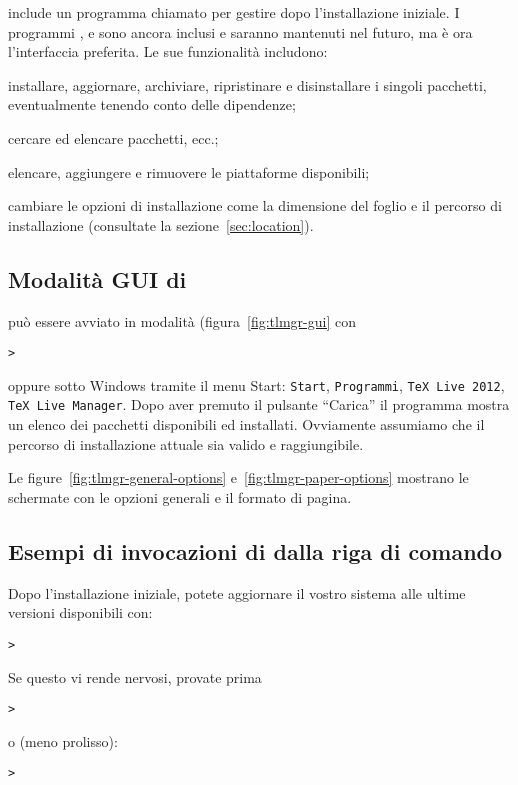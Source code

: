 \documentclass{article}
\begin{document}
\TL{} include un programma chiamato  per gestire \TL{} dopo
l'installazione iniziale. I programmi ,  e
 sono ancora inclusi e saranno mantenuti nel futuro, ma
 è ora l'interfaccia preferita. Le sue funzionalità includono:

\begin{itemize*}
\item installare, aggiornare, archiviare, ripristinare e disinstallare i
  singoli pacchetti, eventualmente tenendo conto delle dipendenze;
\item cercare ed elencare pacchetti, ecc.;
\item elencare, aggiungere e rimuovere le piattaforme disponibili;
\item cambiare le opzioni di installazione come la dimensione del foglio e
  il percorso di installazione (consultate la sezione~\ref{sec:location}).
\end{itemize*}

\subsection{Modalità GUI di }
 può essere avviato in modalità \GUI{}
(figura~\ref{fig:tlmgr-gui} con
\begin{alltt}
> 
\end{alltt}
oppure sotto Windows tramite il menu Start: \texttt{Start},
\texttt{Programmi}, \texttt{TeX Live 2012}, \texttt{TeX Live Manager}.
Dopo aver premuto il pulsante ``Carica'' il programma mostra un elenco dei
pacchetti disponibili ed installati. Ovviamente assumiamo che il percorso
di installazione attuale sia valido e raggiungibile.

Le figure~\ref{fig:tlmgr-general-options} e~\ref{fig:tlmgr-paper-options}
mostrano le schermate con le opzioni generali e il formato di pagina.

\subsection{Esempi di invocazioni di  dalla riga di comando}

Dopo l'installazione iniziale, potete aggiornare il vostro sistema alle
ultime versioni disponibili con:
\begin{alltt}
> 
\end{alltt}
Se questo vi rende nervosi, provate prima
\begin{alltt}
> 
\end{alltt}
o (meno prolisso):
\begin{alltt}
> 
\end{alltt}
\end{document}
